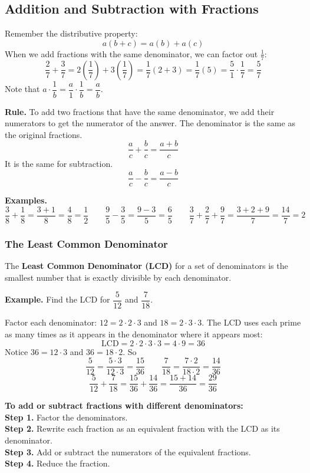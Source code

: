 \documentclass[letter]{article}
\newenvironment{keybox}
  {\begin{lrbox}{\keyboxsave}\begin{minipage}{\dimexpr\linewidth-2\fboxsep-2\fboxrule\relax}}
  {\end{minipage}\end{lrbox}\par\noindent\fbox{\usebox{\keyboxsave}}\par}
\begin{document}

\subsection{Addition and Subtraction with Fractions}

Remember the distributive property:
\[a(b+c)=a(b)+a(c)\]
When we add fractions with the same denominator, we can factor out $\frac17$:
\[
  \frac27+\frac37=2\left(\frac17\right)+3\left(\frac17\right)=\frac17(2+3)=\frac17(5)=\frac51\cdot\frac17=\frac57
\]
Note that $a\cdot\dfrac1b=\dfrac a1\cdot\dfrac1b=\dfrac ab$.

\begin{keybox}
\textbf{Rule.} To add two fractions that have the same denominator, we add their numerators to get the numerator of the answer. The denominator is the same as the original fractions.
\[\frac ac+\frac bc=\frac{a+b}c\]
It is the same for subtraction.
\[\frac ac-\frac bc=\frac{a-b}c\]
\end{keybox}

\textbf{Examples.}
\[\frac38+\frac18=\frac{3+1}8=\frac48=\frac12\qquad
\frac95-\frac35=\frac{9-3}5=\frac65\qquad
\frac37+\frac27+\frac97=\frac{3+2+9}7=\frac{14}7=2\]

\subsubsection*{The Least Common Denominator}

\begin{keybox}
The \textbf{Least Common Denominator (LCD)} for a set of denominators is the smallest number that is exactly divisible by each denominator.
\end{keybox}

\textbf{Example.} Find the LCD for $\dfrac5{12}$ and $\dfrac7{18}$.

Factor each denominator: $12=2\cdot2\cdot3$ and $18=2\cdot3\cdot3$. The LCD uses each prime as many times as it appears in the denominator where it appears most:
\[\text{LCD}=2\cdot2\cdot3\cdot3=4\cdot9=36\]
Notice $36=12\cdot3$ and $36=18\cdot2$. So
\[
  \frac5{12}=\frac{5\cdot3}{12\cdot3}=\frac{15}{36}\qquad\frac7{18}=\frac{7\cdot2}{18\cdot2}=\frac{14}{36}
\]
\[
  \frac5{12}+\frac7{18}=\frac{15}{36}+\frac{14}{36}=\frac{15+14}{36}=\frac{29}{36}
\]

\begin{keybox}
\textbf{To add or subtract fractions with different denominators:}\\
\textbf{Step 1.} Factor the denominators.\\
\textbf{Step 2.} Rewrite each fraction as an equivalent fraction with the LCD as its denominator.\\
\textbf{Step 3.} Add or subtract the numerators of the equivalent fractions.\\
\textbf{Step 4.} Reduce the fraction.
\end{keybox}
\end{document}
